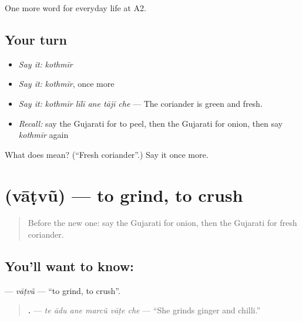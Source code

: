 \begin{grammarlens}[title={What you've built}]
One more word for everyday life at A2.
\end{grammarlens}

\subsection*{Your turn}
\begin{itemize}
\raggedright
  \item \emph{Say it:} \emph{kothmīr}
  \item \emph{Say it:} \emph{kothmīr}, once more
  \item \emph{Say it:} \emph{kothmīr līlī ane tājī che} — The coriander is green and fresh.
  \item \emph{Recall:} say the Gujarati for to peel, then the Gujarati for onion, then say \emph{kothmīr} again
\end{itemize}

\begin{tcolorbox}[breakable,colback=teal!4,colframe=teal!35!black,title={Before you move on}]
What does  mean? (\textquotedblleft{}Fresh coriander\textquotedblright{}.) Say it once more.
\end{tcolorbox}
\section[\texorpdfstring{\gu{વાટવું} (vāṭvũ)}{વાટવું (vāṭvũ)}]{ (vāṭvũ) — to grind, to crush}

\label{lesson:GU-C166-vatvu}



\begin{quote}
Before the new one: say the Gujarati for onion, then the Gujarati for fresh coriander.
\end{quote}

\subsection*{You'll want to know: }
\textbf{} — \emph{vāṭvũ} — \textquotedblleft{}to grind, to crush\textquotedblright{}.

\begin{quote}
\textbf{     .} — \emph{te ādu ane marcũ vāṭe che} — \textquotedblleft{}She grinds ginger and chilli.\textquotedblright{}
\end{quote}

